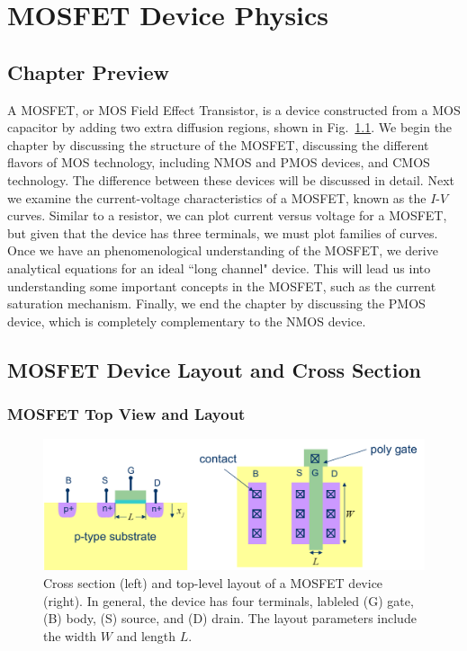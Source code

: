 
\chapter{MOSFET Device Physics}


\graphicspath{{./figs_mos/}}


\section{Chapter Preview}

A MOSFET, or MOS Field Effect Transistor, is a device constructed from a MOS capacitor by adding two extra diffusion regions, shown in Fig.~\ref{fig:mosfet_layout}.  We begin the chapter by discussing the structure of the MOSFET, discussing the different flavors of MOS technology, including NMOS and PMOS devices, and CMOS technology.  The difference between these devices will be discussed in detail.  Next we examine the current-voltage characteristics of a MOSFET, known as the $I$-$V$ curves.  Similar to a resistor, we can plot current versus voltage for a MOSFET, but given that the device has three terminals, we must plot families of curves.  Once we have an phenomenological understanding of the MOSFET, we derive analytical equations for an ideal ``long channel" device.  This will lead us into understanding some important concepts in the MOSFET, such as the current saturation mechanism.  Finally, we end the chapter by discussing the PMOS device, which is completely complementary to the NMOS device.  
  
 


\section{MOSFET Device Layout and Cross Section}


\subsection{MOSFET Top View and Layout}

\begin{figure}[tb]
\begin{center}
\includegraphics[width=.95\columnwidth]{mosfet_layout}
\end{center}
\caption{Cross section (left) and top-level layout of a MOSFET device (right).  In general, the device has four terminals, lableled (G) gate, (B) body, (S) source, and (D) drain.  The layout parameters include the width $W$ and length $L$.  } \label{fig:mosfet_layout}
\end{figure}

